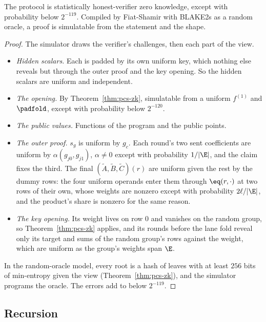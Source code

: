 \begin{theorem}\label{thm:zk}
The protocol is statistically honest-verifier zero knowledge, except with probability below $2^{-119}$. Compiled by Fiat-Shamir with BLAKE2s as a random oracle, a proof is simulatable from the statement and the shape.
\end{theorem}
\begin{proof}
The simulator draws the verifier's challenges, then each part of the view.
\begin{itemize}[itemsep=1pt,topsep=2pt]
\item \emph{Hidden scalars.} Each is padded by its own uniform key, which nothing else reveals but through the outer proof and the key opening. So the hidden scalars are uniform and independent.
\item \emph{The opening.} By Theorem~\ref{thm:pcs-zk}, simulatable from a uniform $f^{(1)}$ and $\padfold$, except with probability below $2^{-120}$.
\item \emph{The public values.} Functions of the program and the public points.
\item \emph{The outer proof.} $s_g$ is uniform by $g_c$. Each round's two sent coefficients are uniform by $\alpha (g_{j0}, g_{j1})$, $\alpha \ne 0$ except with probability $1/|\E|$, and the claim fixes the third. The final $(\tilde A, \tilde B, \tilde C)(r)$ are uniform given the rest by the dummy rows: the four uniform operands enter them through $\eq(r, \cdot)$ at two rows of their own, whose weights are nonzero except with probability $2\ell/|\E|$, and the product's share is nonzero for the same reason.
\item \emph{The key opening.} Its weight lives on row $0$ and vanishes on the random group, so Theorem~\ref{thm:pcs-zk} applies, and its rounds before the lane fold reveal only its target and sums of the random group's rows against the weight, which are uniform as the group's weights span $\E$.
\end{itemize}
In the random-oracle model, every root is a hash of leaves with at least $256$ bits of min-entropy given the view (Theorem~\ref{thm:pcs-zk}), and the simulator programs the oracle. The errors add to below $2^{-119}$.
\end{proof}

\subsection{Recursion}\label{zk:rec}

